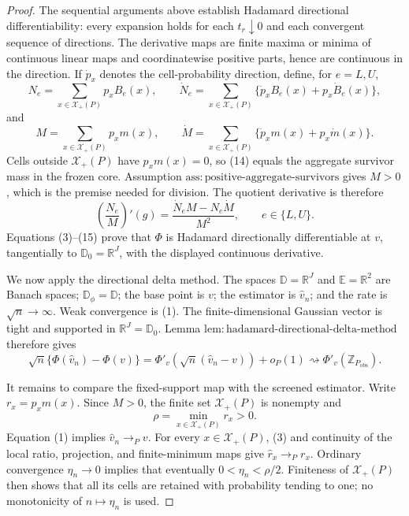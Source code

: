 \documentclass{article}
\begin{document}
\begin{proof}
The sequential arguments above establish Hadamard directional
differentiability: every expansion holds for each \(t_r\downarrow0\) and
each convergent sequence of directions.  The derivative maps are finite
maxima or minima of continuous linear maps and coordinatewise positive
parts, hence are continuous in the direction.  If \(\dot p_x\) denotes
the cell-probability direction, define, for \(e=L,U\),
\[
N_e=\sum_{x\in\mathcal X_+(P)}p_xB_e(x),
\qquad
\dot N_e=\sum_{x\in\mathcal X_+(P)}
\{\dot p_xB_e(x)+p_x\dot B_e(x)\},
\tag{13}
\]
and
\[
M=\sum_{x\in\mathcal X_+(P)}p_xm(x),
\qquad
\dot M=\sum_{x\in\mathcal X_+(P)}
\{\dot p_xm(x)+p_x\dot m(x)\}.
\tag{14}
\]
Cells outside \(\mathcal X_+(P)\) have \(p_xm(x)=0\), so (14) equals
the aggregate survivor mass in the frozen core.  Assumption
\(\mathrm{ass{:}positive\text{-}aggregate\text{-}survivors}\) gives
\(M>0\), which is the premise needed for division.  The quotient
derivative is therefore
\[
\left(\frac{N_e}{M}\right)'(g)
=\frac{\dot N_eM-N_e\dot M}{M^2},
\qquad e\in\{L,U\}.
\tag{15}
\]
Equations (3)--(15) prove that \(\Phi\) is Hadamard directionally
differentiable at \(v\), tangentially to
\(\mathbb D_0=\mathbb R^J\), with the displayed continuous derivative.

We now apply the directional delta method.  The spaces
\(\mathbb D=\mathbb R^J\) and \(\mathbb E=\mathbb R^2\) are Banach
spaces; \(\mathbb D_\phi=\mathbb D\); the base point is \(v\); the
estimator is \(\widehat v_n\); and the rate is \(\sqrt n\to\infty\).
Weak convergence is (1).  The finite-dimensional Gaussian vector is
tight and supported in \(\mathbb R^J=\mathbb D_0\).  Lemma
\(\mathrm{lem{:}hadamard\text{-}directional\text{-}delta\text{-}method}\)
therefore gives
\[
\sqrt n\{\Phi(\widehat v_n)-\Phi(v)\}
=\Phi'_v\!\left(\sqrt n(\widehat v_n-v)\right)+o_P(1)
\rightsquigarrow\Phi'_v(\mathbb Z_{P_{\mathrm{obs}}}).
\tag{16}
\]

It remains to compare the fixed-support map with the screened estimator.
Write \(r_x=p_xm(x)\).  Since \(M>0\), the finite set
\(\mathcal X_+(P)\) is nonempty and
\[
\rho=\min_{x\in\mathcal X_+(P)}r_x>0.
\tag{17}
\]
Equation (1) implies \(\widehat v_n\to_Pv\).  For every
\(x\in\mathcal X_+(P)\), (3) and continuity of the local ratio,
projection, and finite-minimum maps give \(\widehat r_x\to_Pr_x\).
Ordinary convergence \(\eta_n\to0\) implies that eventually
\(0<\eta_n<\rho/2\).  Finiteness of \(\mathcal X_+(P)\) then shows that
all its cells are retained with probability tending to one; no
monotonicity of \(n\mapsto\eta_n\) is used.


\end{proof}
\end{document}
